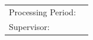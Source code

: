 \begin{titlepage}
\begin{center}
	\setlength{\tabcolsep}{24pt}	%
	\begin{tabular}{ll}
		Processing Period:&  \myperiod\\
		Supervisor:&\mytutor\\
	\end{tabular}
	\setlength{\tabcolsep}{6pt}		%
	\restoregeometry
\end{center}
\end{titlepage}
\clearpage

